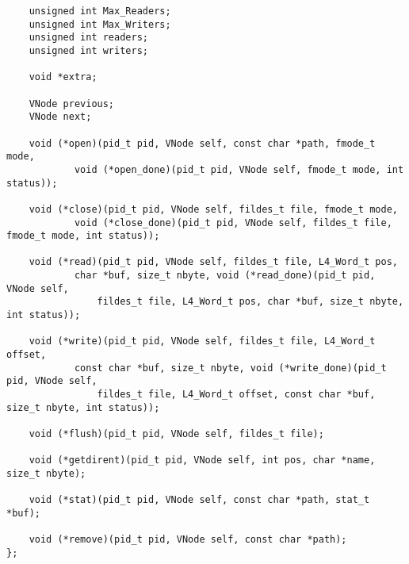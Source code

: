 \documentclass[12pt,english]{article}
\begin{document}
\begin{itemize}
\begin{verbatim}
	unsigned int Max_Readers;
	unsigned int Max_Writers;
	unsigned int readers;
	unsigned int writers;
	
	void *extra; 

	VNode previous;
	VNode next;

	void (*open)(pid_t pid, VNode self, const char *path, fmode_t mode,
			void (*open_done)(pid_t pid, VNode self, fmode_t mode, int status));

	void (*close)(pid_t pid, VNode self, fildes_t file, fmode_t mode,
			void (*close_done)(pid_t pid, VNode self, fildes_t file, fmode_t mode, int status));

	void (*read)(pid_t pid, VNode self, fildes_t file, L4_Word_t pos,
			char *buf, size_t nbyte, void (*read_done)(pid_t pid, VNode self,
				fildes_t file, L4_Word_t pos, char *buf, size_t nbyte, int status));

	void (*write)(pid_t pid, VNode self, fildes_t file, L4_Word_t offset,
			const char *buf, size_t nbyte, void (*write_done)(pid_t pid, VNode self,
				fildes_t file, L4_Word_t offset, const char *buf, size_t nbyte, int status));

	void (*flush)(pid_t pid, VNode self, fildes_t file);

	void (*getdirent)(pid_t pid, VNode self, int pos, char *name, size_t nbyte);

	void (*stat)(pid_t pid, VNode self, const char *path, stat_t *buf);

	void (*remove)(pid_t pid, VNode self, const char *path);
};
\end{verbatim}


\end{itemize}
\end{document}
